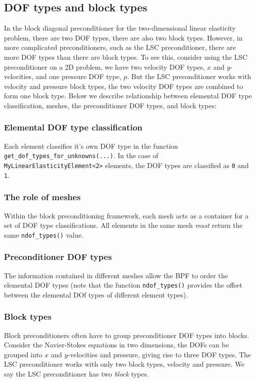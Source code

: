 \subsection{DOF types and block types\label{sec:dof_types_and_block_types_v1}}
In the block diagonal preconditioner for the two-dimensional linear elasticity 
problem, there are two DOF types, there are also two block types. However, in 
more complicated preconditioners, such as the LSC preconditioner, there are 
more DOF types than there are block types. To see this, consider  using the 
LSC preconditioner on a 2D problem, we have two velocity DOF types, $x$ and 
$y$-velocities, and one pressure DOF type, $p$. But the LSC preconditioner 
works with velocity and pressure block types, the two velocity DOF types are 
combined to form one block type. Below we describe relationship between 
elemental DOF type classification, meshes, the preconditioner DOF types, 
and block types:

\subsubsection{Elemental DOF type classification}
Each element classifies it's own DOF type in the function 
\texttt{get\_\allowbreak dof\_\allowbreak types\_\allowbreak for\_\allowbreak unknowns(...)}. In the case of 
\texttt{My\allowbreak Linear\allowbreak Elasticity\allowbreak Element<2>} elements, the DOF types are classified as 
\texttt{0} and \texttt{1}.

\subsubsection{The role of meshes}
Within the block preconditioning framework, each mesh acts as a container for 
a set of DOF type classifications. All elements in the same mesh \emph{must} 
return the same \texttt{ndof\_\allowbreak types()} value.

\subsubsection{Preconditioner DOF types}
The information contained in different meshes allow the BPF to order the elemental
DOF types (note that the function \texttt{ndof\_\allowbreak types()} provides 
the offset between the elemental DOf types of different element types).

\subsubsection{Block types}
Block preconditioners often have to group preconditioner DOF types into blocks.
Consider the Navier-Stokes equations in two dimensions, the DOFs can be grouped
into $x$ and $y$-velocities and pressure, giving rise to three DOF types.
The LSC preconditioner works with only two block types, velocity and pressure.
We say the LSC preconditioner has two \emph{block} types.

